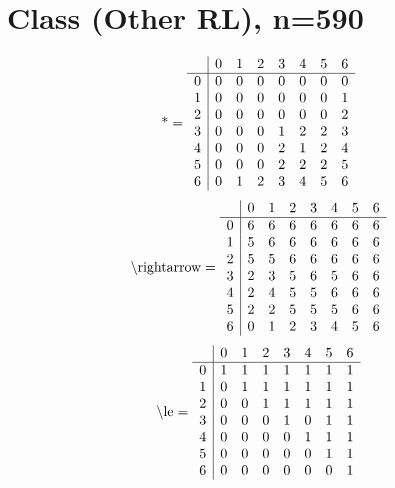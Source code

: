 \documentclass[11pt]{article}
\begin{document}
\section{Class (Other RL), n=590}
\[\text{*} = 
\begin{array}{r | r r r r r r r}
 & 0 & 1 & 2 & 3 & 4 & 5 & 6 \\ \hline
0 & 0 & 0 & 0 & 0 & 0 & 0 & 0 \\
1 & 0 & 0 & 0 & 0 & 0 & 0 & 1 \\
2 & 0 & 0 & 0 & 0 & 0 & 0 & 2 \\
3 & 0 & 0 & 0 & 1 & 2 & 2 & 3 \\
4 & 0 & 0 & 0 & 2 & 1 & 2 & 4 \\
5 & 0 & 0 & 0 & 2 & 2 & 2 & 5 \\
6 & 0 & 1 & 2 & 3 & 4 & 5 & 6 \\
\end{array}
\]
\[\text{\textbackslash rightarrow} = 
\begin{array}{r | r r r r r r r}
 & 0 & 1 & 2 & 3 & 4 & 5 & 6 \\ \hline
0 & 6 & 6 & 6 & 6 & 6 & 6 & 6 \\
1 & 5 & 6 & 6 & 6 & 6 & 6 & 6 \\
2 & 5 & 5 & 6 & 6 & 6 & 6 & 6 \\
3 & 2 & 3 & 5 & 6 & 5 & 6 & 6 \\
4 & 2 & 4 & 5 & 5 & 6 & 6 & 6 \\
5 & 2 & 2 & 5 & 5 & 5 & 6 & 6 \\
6 & 0 & 1 & 2 & 3 & 4 & 5 & 6 \\
\end{array}
\]
\[\text{\textbackslash le} = 
\begin{array}{r | r r r r r r r}
 & 0 & 1 & 2 & 3 & 4 & 5 & 6 \\ \hline
0 & 1 & 1 & 1 & 1 & 1 & 1 & 1 \\
1 & 0 & 1 & 1 & 1 & 1 & 1 & 1 \\
2 & 0 & 0 & 1 & 1 & 1 & 1 & 1 \\
3 & 0 & 0 & 0 & 1 & 0 & 1 & 1 \\
4 & 0 & 0 & 0 & 0 & 1 & 1 & 1 \\
5 & 0 & 0 & 0 & 0 & 0 & 1 & 1 \\
6 & 0 & 0 & 0 & 0 & 0 & 0 & 1 \\
\end{array}
\]
\end{document}
